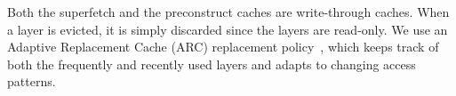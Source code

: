 Both the superfetch and the preconstruct caches are write-through caches.
When a layer is evicted, it is simply discarded since the layers are read-only.
%
We use an Adaptive Replacement Cache (ARC) replacement policy~\cite{megiddo2003arc}, which keeps track of both the frequently and recently used layers and adapts to changing access patterns. 

%
%



